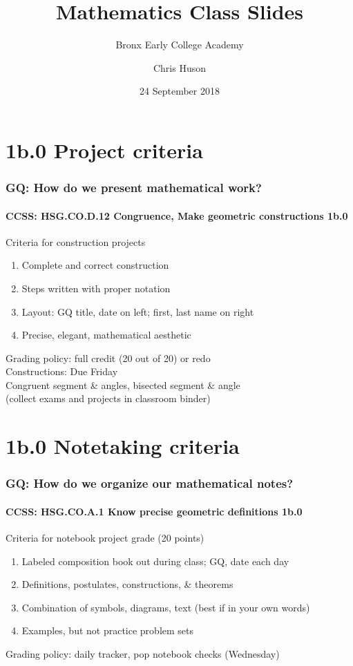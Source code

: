 \documentclass{beamer}
\title{Mathematics Class Slides}
\subtitle{Bronx Early College Academy}
\author{Chris Huson}
\date{24 September 2018}
\begin{document}
\frame{\titlepage}
\section[Outline]{}
\frame{\tableofcontents}

\section{1b.0 Project criteria}
  \frame
  {
    \frametitle{GQ: How do we present mathematical work?}
    \framesubtitle{CCSS: HSG.CO.D.12 Congruence, Make geometric constructions  \alert{1b.0}}

    \begin{block}{Criteria for construction projects}
    \begin{enumerate}
        \item Complete and correct construction
        \item Steps written with proper notation
        \item Layout: GQ title, date on left; first, last name on right
        \item Precise, elegant, mathematical aesthetic
    \end{enumerate}
    \end{block}
    Grading policy: full credit (20 out of 20) or redo\\[5pt]
    Constructions: \alert{Due Friday}\\
    Congruent segment \& angles, bisected segment \& angle \\
    (collect exams and projects in classroom binder)
  }

\section{1b.0 Notetaking criteria}
  \frame
  {
    \frametitle{GQ: How do we organize our mathematical notes?}
    \framesubtitle{CCSS: HSG.CO.A.1 Know precise geometric definitions  \alert{1b.0}}

    \begin{block}{Criteria for notebook project grade (20 points)}
    \begin{enumerate}
        \item Labeled composition book out during class; GQ, date each day
        \item Definitions, postulates, constructions, \& theorems
        \item Combination of symbols, diagrams, text (best if in your own words)
        \item Examples, but not practice problem sets
    \end{enumerate}
    \end{block}
    Grading policy: daily tracker, pop notebook checks (Wednesday)
  }
\end{document}
